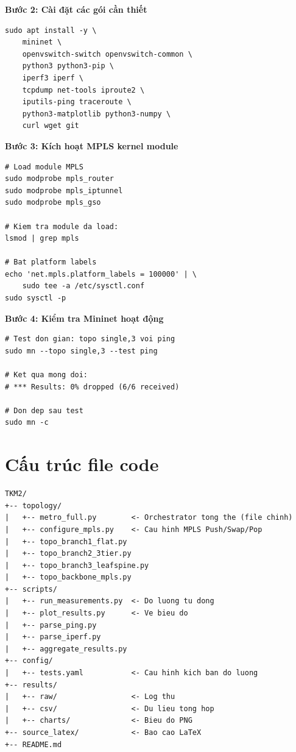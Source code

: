 \textbf{Bước 2: Cài đặt các gói cần thiết}

\begin{lstlisting}[style=bashstyle, caption={Cài đặt Mininet và các công cụ hỗ trợ}]
sudo apt install -y \
    mininet \
    openvswitch-switch openvswitch-common \
    python3 python3-pip \
    iperf3 iperf \
    tcpdump net-tools iproute2 \
    iputils-ping traceroute \
    python3-matplotlib python3-numpy \
    curl wget git
\end{lstlisting}

\textbf{Bước 3: Kích hoạt MPLS kernel module}

\begin{lstlisting}[style=bashstyle, caption={Load module MPLS và bật platform labels}]
# Load module MPLS
sudo modprobe mpls_router
sudo modprobe mpls_iptunnel
sudo modprobe mpls_gso

# Kiem tra module da load:
lsmod | grep mpls

# Bat platform labels
echo 'net.mpls.platform_labels = 100000' | \
    sudo tee -a /etc/sysctl.conf
sudo sysctl -p
\end{lstlisting}

\textbf{Bước 4: Kiểm tra Mininet hoạt động}

\begin{lstlisting}[style=bashstyle, caption={Kiểm tra Mininet với topo đơn giản}]
# Test don gian: topo single,3 voi ping
sudo mn --topo single,3 --test ping

# Ket qua mong doi:
# *** Results: 0% dropped (6/6 received)

# Don dep sau test
sudo mn -c
\end{lstlisting}

\section{Cấu trúc file code}

\begin{Verbatim}[fontsize=\small, frame=single, label={Cây thư mục dự án}]
TKM2/
+-- topology/
|   +-- metro_full.py        <- Orchestrator tong the (file chinh)
|   +-- configure_mpls.py    <- Cau hinh MPLS Push/Swap/Pop
|   +-- topo_branch1_flat.py
|   +-- topo_branch2_3tier.py
|   +-- topo_branch3_leafspine.py
|   +-- topo_backbone_mpls.py
+-- scripts/
|   +-- run_measurements.py  <- Do luong tu dong
|   +-- plot_results.py      <- Ve bieu do
|   +-- parse_ping.py
|   +-- parse_iperf.py
|   +-- aggregate_results.py
+-- config/
|   +-- tests.yaml           <- Cau hinh kich ban do luong
+-- results/
|   +-- raw/                 <- Log thu
|   +-- csv/                 <- Du lieu tong hop
|   +-- charts/              <- Bieu do PNG
+-- source_latex/            <- Bao cao LaTeX
+-- README.md
\end{Verbatim}

